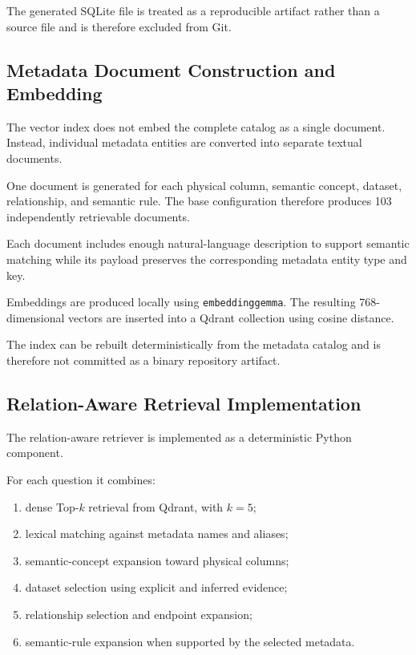The generated SQLite file is treated as a reproducible artifact rather than a
source file and is therefore excluded from Git.


\subsection{Metadata Document Construction and Embedding}

The vector index does not embed the complete catalog as a single document.
Instead, individual metadata entities are converted into separate textual
documents.

One document is generated for each physical column, semantic concept, dataset,
relationship, and semantic rule. The base configuration therefore produces
103 independently retrievable documents.

Each document includes enough natural-language description to support
semantic matching while its payload preserves the corresponding metadata
entity type and key.

Embeddings are produced locally using \texttt{embeddinggemma}. The resulting
768-dimensional vectors are inserted into a Qdrant collection using cosine
distance.

The index can be rebuilt deterministically from the metadata catalog and is
therefore not committed as a binary repository artifact.


\subsection{Relation-Aware Retrieval Implementation}

The relation-aware retriever is implemented as a deterministic Python
component.

For each question it combines:

\begin{enumerate}

    \item dense Top-\(k\) retrieval from Qdrant, with \(k=5\);

    \item lexical matching against metadata names and aliases;

    \item semantic-concept expansion toward physical columns;

    \item dataset selection using explicit and inferred evidence;

    \item relationship selection and endpoint expansion;

    \item semantic-rule expansion when supported by the selected metadata.

\end{enumerate}

